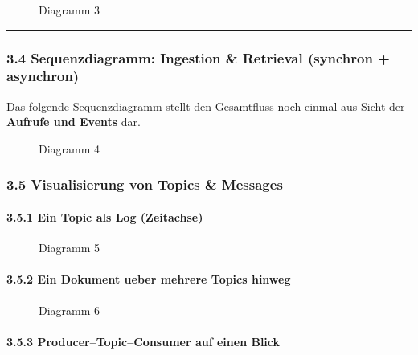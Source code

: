 \begin{figure}
\centering
\pandocbounded{}
\caption{Diagramm 3}
\end{figure}

\begin{center}\rule{0.5\linewidth}{0.5pt}\end{center}

\subsubsection{3.4 Sequenzdiagramm: Ingestion \& Retrieval (synchron +
asynchron)}\label{sequenzdiagramm-ingestion-retrieval-synchron-asynchron}

Das folgende Sequenzdiagramm stellt den Gesamtfluss noch einmal aus
Sicht der \textbf{Aufrufe und Events} dar.

\begin{figure}
\centering
\pandocbounded{}
\caption{Diagramm 4}
\end{figure}

\subsubsection{3.5 Visualisierung von Topics \&
Messages}\label{visualisierung-von-topics-messages}

\paragraph{3.5.1 Ein Topic als Log
(Zeitachse)}\label{ein-topic-als-log-zeitachse}

\begin{figure}
\centering
\pandocbounded{}
\caption{Diagramm 5}
\end{figure}

\paragraph{3.5.2 Ein Dokument ueber mehrere Topics
hinweg}\label{ein-dokument-ueber-mehrere-topics-hinweg}

\begin{figure}
\centering
\pandocbounded{}
\caption{Diagramm 6}
\end{figure}

\paragraph{3.5.3 Producer--Topic--Consumer auf einen
Blick}\label{producertopicconsumer-auf-einen-blick}

